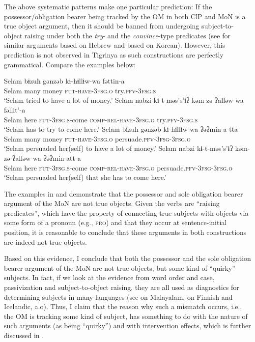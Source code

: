 \documentclass[output=paper]{langscibook}
\begin{document}
The above systematic patterns make one particular prediction:  If the possessor/obligation bearer being tracked by the OM in both ClP and MoN is a true object argument, then it should be banned from undergoing subject-to-object raising under both the \emph{try}- and the \emph{convince}-type predicates (see for similar arguments \citet{landau1999} based on Hebrew and \citet{kim11} based on Korean). However, this prediction is not observed in Tigrinya as such constructions are perfectly grammatical. Compare the examples below:


\ea\label{ex:Gebregziabher:RTO1}
\ea\label{ex:Gebregziabher:sor1} 
\gll Selam bɨzuħ gənzəb kɨ-hɨllɨw-wa fəttin-a\\
Selam many money {\scshape fut-have-3fsg.o} try.{\scshape pfv-3fsg.s}\\
\glt `Selam tried to have a lot of money.'
\ex\label{ex:Gebregziabher:sor2}  
\gll Selam nabzi kɨ-t-məs's'ɨʔ kəm-zə-ʔalləw-wa fəllit'-a\\
Selam here {\scshape fut-3fsg.s-}come {\scshape comp-rel-have-3fsg.o} try.{\scshape pfv-3fsg.s}\\
\glt `Selam has to try to come here.'
\z
\ex\label{ex:Gebregziabher:RTO2}
\ea\label{ex:Gebregziabher:sor3}  
\gll Selam bɨzuħ gənzəb kɨ-hɨllɨw-wa ʔəʔmin-a-tta\\
Selam many money {\scshape fut-have-3fsg.o} persuade.{\scshape pfv-3fsg-3fsg.o} \\
\glt `Selam persuaded her(self) to have a lot of money.'
\ex\label{ex:Gebregziabher:sor4}
\gll Selam nabzi kɨ-t-məs's'ɨʔ kəm-zə-ʔalləw-wa ʔəʔmin-att-a\\
Selam here {\scshape fut-3fsg.s-}come {\scshape comp-rel-have-3fsg.o} persuade.{\scshape pfv-3fsg-3fsg.o}\\
\glt `Selam persuaded her(self) that she has to come here.'
\z
\z

\noindent The examples in  and  demonstrate that the possessor and sole obligation bearer argument of the MoN are not true objects. Given the verbs are ``raising predicates'', which have the property of connecting true subjects with objects via some form of a pronoun (e.g., {\scshape pro}) and that they occur at sentence-initial position, it is reasonable to conclude that these arguments in both constructions are indeed not true objects.

Based on this evidence, I conclude that both the possessor and the sole obligation bearer argument of the MoN are not true objects, but some kind of ``quirky'' subjects. In fact, if we look at the evidence from word order and case, passivization and subject-to-object raising, they are all used as diagnostics for determining subjects in many languages (see \citealt{jaya2004} on Malayalam, \citealt{holmberg05} on Finnish and Icelandic, a.o). Thus, I claim that the reason why such a mismatch occurs, i.e., the OM is tracking some kind of subject, has something to do with the nature of such arguments (as being ``quirky'') and with intervention effects, which is further discussed in . 
\end{document}
